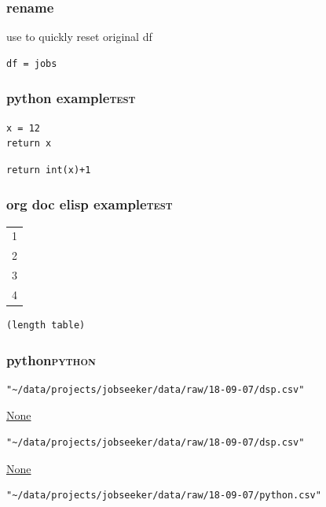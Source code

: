 \documentclass[11pt]{article}
\begin{document}
\subsubsection{rename}
\label{sec:org18e32be}
use to quickly reset original df
\begin{verbatim}
df = jobs
\end{verbatim}

\subsubsection{python example\hfill{}\textsc{test}}
\label{sec:org7f2474d}
\begin{verbatim}
x = 12
return x
\end{verbatim}

\begin{verbatim}
return int(x)+1
\end{verbatim}

\subsubsection{org doc elisp example\hfill{}\textsc{test}}
\label{sec:orgd647c97}
\begin{center}
\label{tab:org91470b1}
\begin{tabular}{r}
1\\
2\\
3\\
4\\
\end{tabular}
\end{center}

\begin{verbatim}
(length table)
\end{verbatim}

\subsubsection{python\hfill{}\textsc{python}}
\label{sec:org39cf095}
\begin{verbatim}
"~/data/projects/jobseeker/data/raw/18-09-07/dsp.csv"
\end{verbatim}

\url{None}

\begin{verbatim}
"~/data/projects/jobseeker/data/raw/18-09-07/dsp.csv"
\end{verbatim}

\url{None}

\begin{verbatim}
"~/data/projects/jobseeker/data/raw/18-09-07/python.csv"
\end{verbatim}
\end{document}
